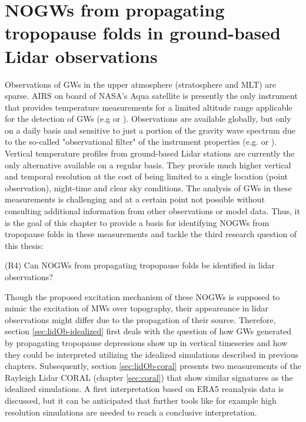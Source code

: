 \chapter{NOGWs from propagating tropopause folds in ground-based Lidar observations}

Observations of GWs in the upper atmosphere (stratosphere and MLT) are sparse. AIRS on board of NASA’s Aqua satellite is presently the only instrument that provides temperature measurements for a limited altitude range applicable for the detection of GWs (e.g \cite[]{hindley_gravity_2019} or \cite[]{hindley_18year_2020}). Observations are available globally, but only on a daily basis and sensitive to just a portion of the gravity wave spectrum due to the so-called "observational filter" of the instrument properties (e.g. \cite[]{preusse_space-based_2002} or \cite[]{alexander_recent_2010}). Vertical temperature profiles from ground-based Lidar stations are currently the only alternative available on a regular basis. They provide much higher vertical and temporal resolution at the cost of being limited to a single location (point observation), night-time and clear sky conditions. The analysis of GWs in these measurements is challenging and at a certain point not possible without consulting additional information from other observations or model data. Thus, it is the goal of this chapter to provide a basis for identifying NOGWs from tropopause folds in these measurements and tackle the third research question of this thesis:

\begin{tcolorbox}[]
    (R4) Can NOGWs from propagating tropopause folds be identified in lidar observations?
\end{tcolorbox}
Though the proposed excitation mechanism of these NOGWs is supposed to mimic the excitation of MWs over topography, their appeareance in lidar observations might differ due to the propagation of their source. Therefore, section \ref{sec:lidOb-idealized} first deals with the question of how GWs generated by propagating tropopause depressions show up in vertical timeseries and how they could be interpreted utilizing the idealized simulations described in previous chapters.
Subsequently, section \ref{sec:lidOb-coral} presents two measurements of the Rayleigh Lidar CORAL (chapter \ref{sec:coral}) that show similar signatures as the idealized simulations. A first interpretation based on ERA5 reanalysis data is discussed, but it can be anticipated that further tools like for example high resolution simulations are needed to reach a conclusive interpretation. 


